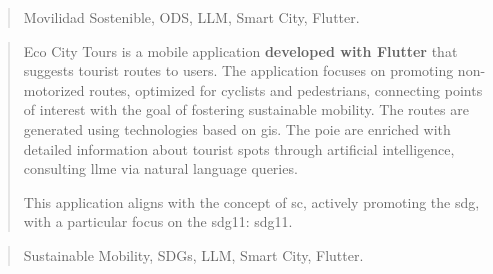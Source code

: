 \documentclass[a4paper,12pt,twoside]{memoir}
\begin{document}
\renewcommand*\abstractname{Descriptores}
\begin{abstract}
Movilidad Sostenible, ODS, LLM, Smart City, Flutter.
\end{abstract}

\clearpage

\renewcommand*\abstractname{Abstract}
\begin{abstract}
		Eco City Tours is a mobile application \textbf{developed with Flutter} that suggests tourist routes to users. The application focuses on promoting non-motorized routes, optimized for cyclists and pedestrians, connecting points of interest with the goal of fostering sustainable mobility. The routes are generated using technologies based on \acrfull{gis}. The \acrfull{poie} are enriched with detailed information about tourist spots through artificial intelligence, consulting \acrfull{llme} via natural language queries.
	
	This application aligns with the concept of \acrshort{sc}, actively promoting the \acrfull{sdg}, with a particular focus on the \acrshort{sdg11}: \acrlong{sdg11}.
\end{abstract}

\renewcommand*\abstractname{Keywords}
\begin{abstract}
	Sustainable Mobility, SDGs, LLM, Smart City, Flutter.
\end{abstract}



\clearpage

\tableofcontents

\clearpage

\listoffigures

\clearpage

\listoftables
\clearpage

\lstlistoflistings
\clearpage

\mainmatter








\printnoidxglossary[type=\acronymtype]
\printnoidxglossary[]






\end{document}
